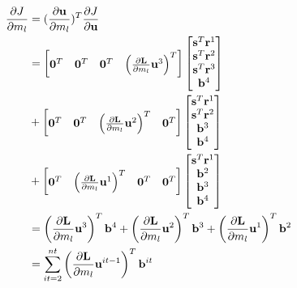\documentclass[revised,endfloat]{geophysics}
\begin{document}
\begin{equation}
\begin{split}
\frac{\partial J}{\partial m_l} &= (\frac{\partial {\bf u}}{\partial m_l})^T \frac{\partial J}{\partial {\bf u}} \\
&= \begin{bmatrix}
{\bf 0}^T & {\bf 0}^T & {\bf 0}^T & \left( {\frac{\partial {\bf L}}{\partial m_l} {\bf u}^3} \right)^T \\
\end{bmatrix}
\begin{bmatrix}
{\bf s}^T {\bf r}^1 \\
{\bf s}^T {\bf r}^2 \\
{\bf s}^T {\bf r}^3 \\
 {\bf b}^4 \\
\end{bmatrix}            \\
&+ \begin{bmatrix}
{\bf 0}^T & {\bf 0}^T & \left( {\frac{\partial {\bf L}}{\partial m_l} {\bf u}^2}  \right)^T & {\bf 0}^T \\
\end{bmatrix}
\begin{bmatrix}
{\bf s}^T {\bf r}^1 \\
{\bf s}^T {\bf r}^2 \\
 {\bf b}^3 \\
 {\bf b}^4 \\
\end{bmatrix}            \\
&+ \begin{bmatrix}
{\bf 0}^T & \left( {\frac{\partial {\bf L}}{\partial m_l} {\bf u}^1}  \right)^T & {\bf 0}^T & {\bf 0}^T \\
\end{bmatrix}
\begin{bmatrix}
{\bf s}^T {\bf r}^1 \\
{\bf b}^2 \\
{\bf b}^3 \\
{\bf b}^4 \\
\end{bmatrix}            \\
&= \left( {\frac{\partial {\bf L}}{\partial m_l} {\bf u}^3} \right)^T {\bf b}^4 + \left( {\frac{\partial {\bf L}}{\partial m_l} {\bf u}^2} \right)^T {\bf b}^3 + \left( {\frac{\partial {\bf L}}{\partial m_l} {\bf u}^1} \right)^T {\bf b}^2 \\
& = \sum_{it=2}^{nt}  \left( {\frac{\partial {\bf L}}{\partial m_l} {\bf u}^{it-1}} \right)^T {\bf b}^{it}
 \end{split}
\label{eq58}
\end{equation}
\end{document}
